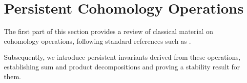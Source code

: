 
\section{Persistent Cohomology Operations}\label{s:steenrod}

The first part of this section provides a review of classical material on cohomology operations, following standard references such as \cite{mosheroperations1968}.

Subsequently, we introduce persistent invariants derived from these operations, establishing sum and product decompositions and proving a stability result for them.




